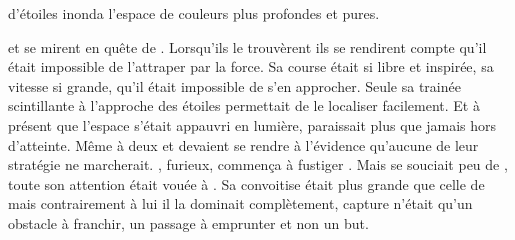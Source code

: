 d'étoiles inonda l'espace de couleurs plus profondes et pures. 





   
   
\Ogo et \Shuru se mirent en quête de \Drisst. Lorsqu'ils le trouvèrent ils se rendirent compte qu'il était impossible de l'attraper par la force. Sa course était si libre et inspirée, sa vitesse si grande, qu'il était impossible de s'en approcher. Seule sa trainée scintillante à l'approche des étoiles permettait de le localiser facilement. Et à présent que l'espace s'était appauvri en lumière, \Drisst paraissait plus que jamais hors d'atteinte. Même à deux \Ogo et \Shuru devaient se rendre à l'évidence qu'aucune de leur stratégie ne marcherait. \Shuru, furieux, commença à fustiger \Ogo. Mais \Ogo se souciait peu de \Shuru, toute son attention était vouée à \Drisst. Sa convoitise était plus grande que celle de \Shuru mais contrairement à lui il la dominait complètement, capture \Drisst n'était qu'un obstacle à franchir, un passage à emprunter et non un but.